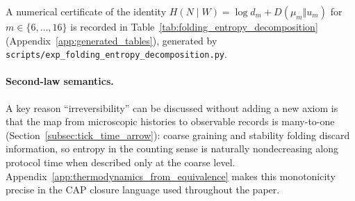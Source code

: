 \AuditTag A numerical certificate of the identity $H(N\mid W)=\log d_m + D(\mu_m\Vert u_m)$
for $m\in\{6,\dots,16\}$ is recorded in Table~\ref{tab:folding_entropy_decomposition} (Appendix~\ref{app:generated_tables}),
generated by \texttt{scripts/exp\_folding\_entropy\_decomposition.py}.

\paragraph{Second-law semantics.}
\InterfaceTag A key reason ``irreversibility'' can be discussed without adding a new axiom is that the map from microscopic histories to observable records is many-to-one (Section~\ref{subsec:tick_time_arrow}):
coarse graining and stability folding discard information, so entropy in the counting sense is naturally nondecreasing along protocol time when described only at the coarse level.
Appendix~\ref{app:thermodynamics_from_equivalence} makes this monotonicity precise in the CAP closure language used throughout the paper.


